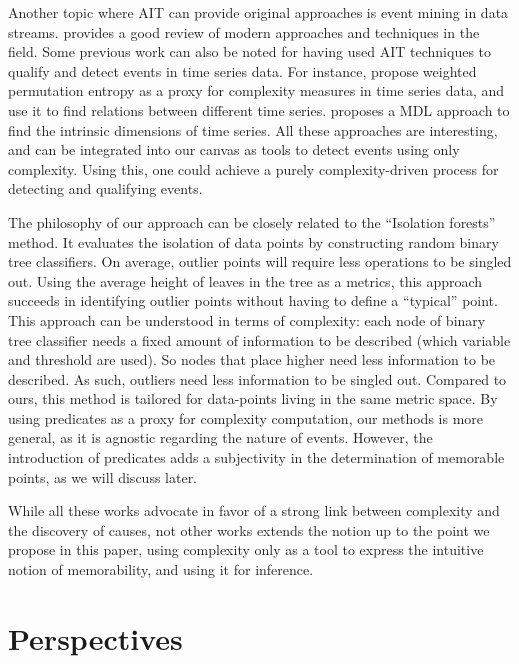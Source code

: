 \documentclass[entropy,article,submit,moreauthors,pdftex]{Definitions/mdpi}
\begin{document}
Another topic where AIT can provide original approaches is event mining in data streams.
\cite{aggarwal_outlier_2017} provides a good review of modern approaches and techniques
in the field. Some previous work can also be noted for having used AIT techniques to qualify and detect events in time series data. For instance, \cite{batista_complexity-invariant_2011,fadlallah_weighted-permutation_2013} propose weighted permutation entropy as a proxy for complexity measures in time series data, and use it to find relations between different time series. \cite{hu_discovering_2011} proposes a MDL approach to find the intrinsic dimensions of time series. All these approaches are interesting, and can be integrated into our canvas as tools to detect events using only complexity. Using this, one could achieve a purely complexity-driven process for detecting and qualifying events.

The philosophy of our approach can be closely related to the ``Isolation forests'' method\cite{liu_isolation_2008,hariri_extended_2021}. It evaluates the isolation of data points by constructing random binary tree classifiers. On average, outlier points will require less operations to be singled out. Using the average height of leaves in the tree as a metrics, this approach succeeds in identifying outlier points without having to define a ``typical'' point. This approach can be understood in terms of complexity: each node of binary tree classifier needs a fixed amount of information to be described (which variable and threshold are used). So nodes that place higher need less information to be described. As such, outliers need less information to be singled out. Compared to ours, this method is tailored for data-points living in the same metric space. By using predicates as a proxy for complexity computation, our methods is more general, as it is agnostic regarding the nature of events. However, the introduction of predicates adds a subjectivity in the determination of memorable points, as we will discuss later.

While all these works advocate in favor of a strong link between complexity and the
discovery of causes, not other works extends the notion up to the point we propose in this paper, using complexity only as a tool to express the intuitive notion of memorability, and using it for inference.

\section{Perspectives}
\label{sec:future}
\end{document}
